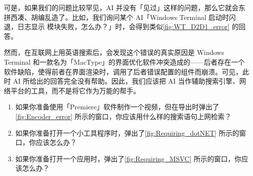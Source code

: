 可是，如果我们的问题比较罕见，AI 并没有「见过」这样的问题，那么它就会东拼西凑、胡编乱造了。比如，我们询问某个 AI「Windows Terminal 启动时闪退，日志显示  模块失败，怎么办？」时，会得到类似\autoref{fig:WT_D2D1_error} 的回答。

然而，在互联网上用英语搜索后，会发现这个错误的真实原因是 Windows Terminal 和一款名为「MacType」的界面优化软件冲突造成的——后者存在一个软件缺陷，使得前者在界面渲染时，调用了后者错误配置的组件而崩溃。可见，此时 AI 所给出的回答完全没有帮助。因此，我们应该把 AI 当作辅助搜索引擎、网络平台的工具，而不是将它作为万能的帮手。

\practice

\begin{enumerate}
  \item 如果你准备使用「Premiere」软件制作一个视频，但在导出时弹出了\autoref{fig:Encoder_error} 所示的窗口，你应该用什么样的搜索语句上网检索？
  \item 如果你准备打开一个小工具程序时，弹出了\autoref{fig:Requiring_dotNET} 所示的窗口，你应该怎么办？
  \item 如果你准备打开一个应用时，弹出了\autoref{fig:Requiring_MSVC} 所示的窗口，你应该怎么办？
\end{enumerate}

